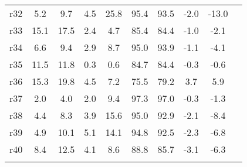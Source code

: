 \begin{tabular*}{\hsize}{ @{\extracolsep{\fill}}l*{9}{c}}
%
r32                      & 5.2     & 9.7     & 4.5     &25.8     &95.4     &93.5     &-2.0     &-13.0\\
%
r33                      &15.1     &17.5     & 2.4     & 4.7     &85.4     &84.4     &-1.0     &-2.1\\
%
r34                      & 6.6     & 9.4     & 2.9     & 8.7     &95.0     &93.9     &-1.1     &-4.1\\
%
r35                      &11.5     &11.8     & 0.3     & 0.6     &84.7     &84.4     &-0.3     &-0.6\\
%
r36                      &15.3     &19.8     & 4.5     & 7.2     &75.5     &79.2     & 3.7     & 5.9\\
%
r37                      & 2.0     & 4.0     & 2.0     & 9.4     &97.3     &97.0     &-0.3     &-1.3\\
%
r38                      & 4.4     & 8.3     & 3.9     &15.6     &95.0     &92.9     &-2.1     &-8.4\\
%
r39                      & 4.9     &10.1     & 5.1     &14.1     &94.8     &92.5     &-2.3     &-6.8\\
%
r40                      & 8.4     &12.5     & 4.1     & 8.6     &88.8     &85.7     &-3.1     &-6.3\\
\\
\hline \hline
\end{tabular*}
